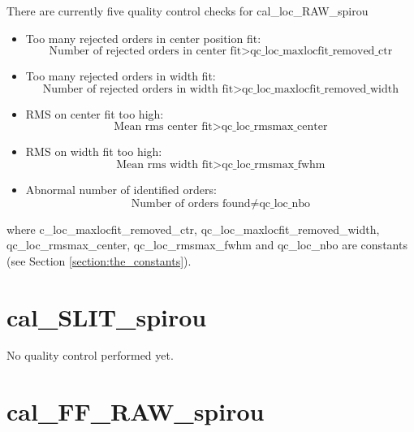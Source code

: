There are currently five quality control checks for cal\_loc\_RAW\_spirou
\begin{itemize}
\item Too many rejected orders in center position fit: 
	\begin{equation}
	\text{Number of rejected orders in center fit} >\text{qc\_loc\_maxlocfit\_removed\_ctr}
	\end{equation}
\item Too many rejected orders in width fit: 
	\begin{equation}
	\text{Number of rejected orders in width fit} >\text{qc\_loc\_maxlocfit\_removed\_width}
	\end{equation}
\item RMS on center fit too high: 
	\begin{equation}
	\text{Mean rms center fit} > \text{qc\_loc\_rmsmax\_center}
	\end{equation}
\item RMS on width fit too high: 
	\begin{equation}
	\text{Mean rms width fit} > \text{qc\_loc\_rmsmax\_fwhm}
	\end{equation}
\item Abnormal number of identified orders: 
	\begin{equation}
	\text{Number of orders found} \neq \text{qc\_loc\_nbo}
	\end{equation}
\end{itemize}

\noindent where c\_loc\_maxlocfit\_removed\_ctr, qc\_loc\_maxlocfit\_removed\_width, qc\_loc\_rmsmax\_center, qc\_loc\_rmsmax\_fwhm and qc\_loc\_nbo are constants (see Section \ref{section:the_constants}).



\section{cal\_SLIT\_spirou}
\label{section:qc_cal_SLIT_spirou}


No quality control performed yet.

\section{cal\_FF\_RAW\_spirou}
\label{section:qc_cal_FF_RAW_spirou}


